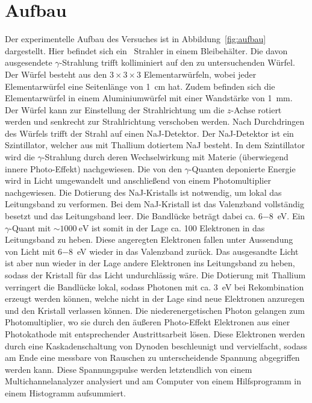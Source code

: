 

\section{Aufbau}

Der experimentelle Aufbau des Versuches ist in Abbildung~\ref{fig:aufbau}
dargestellt. Hier befindet sich ein \Cs~Strahler in einem Bleibehälter.
Die davon ausgesendete $\gamma$-Strahlung trifft kolliminiert auf den zu
untersuchenden Würfel. Der Würfel besteht aus den $3\times 3 \times 3$
Elementarwürfeln, wobei jeder Elementarwürfel eine Seitenlänge von \SI{1}{\cm}
hat. Zudem befinden sich die Elementarwürfel in einem Aluminiumwürfel mit einer
Wandstärke von \SI{1}{\mm}. Der Würfel kann zur Einstellung der Strahlrichtung
um die $z$-Achse rotiert werden und senkrecht zur Strahlrichtung verschoben
werden. Nach Durchdringen des Würfels trifft der Strahl auf einen NaJ-Detektor.
Der NaJ-Detektor ist ein Szintillator, welcher aus mit Thallium dotiertem NaJ
besteht. In dem Szintillator wird die
$\gamma$-Strahlung durch deren Wechselwirkung mit Materie
(überwiegend innere Photo-Effekt) nachgewiesen.\cite{kern_und_teilchenphysik}
Die von den $\gamma$-Quanten deponierte Energie wird in
Licht umgewandelt und anschließend von einem Photomultiplier nachgewiesen.
Die Dotierung des NaJ-Kristalls ist notwendig, um lokal das Leitungsband zu
verformen. Bei dem NaJ-Kristall ist das Valenzband vollständig besetzt und das
Leitungsband leer. Die Bandlücke beträgt dabei ca. \SI{6-8}{\eV}.
Ein $\gamma$-Quant mit $\sim \SI{1000}{\eV}$ ist somit in der Lage ca. 100
Elektronen in das Leitungsband zu heben. Diese angeregten Elektronen fallen
unter Aussendung von Licht mit \SI{6-8}{\eV} wieder in das Valenzband zurück.
Das ausgesandte Licht ist aber nun wieder in der Lage andere Elektronen ins
Leitungsband zu heben, sodass der Kristall für das Licht undurchlässig wäre.
Die Dotierung mit Thallium verringert die Bandlücke lokal, sodass Photonen mit
ca. \SI{3}{\eV} bei Rekombination erzeugt werden können, welche nicht in der
Lage sind neue Elektronen anzuregen und den Kristall verlassen können.
Die niederenergetischen Photon gelangen zum Photomultiplier, wo sie durch den
äußeren Photo-Effekt Elektronen aus einer Photokathode mit entsprechender
Austrittsarbeit lösen. Diese Elektronen werden durch eine Kaskadenschaltung von
Dynoden beschleunigt und vervielfacht, sodass am Ende eine messbare von
Rauschen zu unterscheidende Spannung abgegriffen werden kann.
Diese Spannungspulse werden letztendlich von einem Multichannelanalyzer
analysiert und am Computer von einem Hilfsprogramm in einem Histogramm
aufsummiert.

